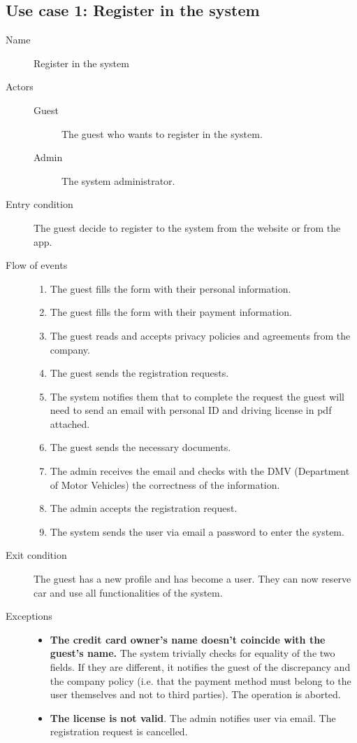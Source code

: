	\subsection{Use case 1: Register in the system}
		\begin{description}
			\item[Name] Register in the system
			\item[Actors] \hfill
				\begin{description}
					\item[Guest] The guest who wants to register in the system.
					\item[Admin] The system administrator.
				\end{description}
			\item[Entry condition] The guest decide to register to the system from the website or from the app.
			\item[Flow of events] \hfill
				\begin{enumerate}
					\item The guest fills the form with their personal information.
					\item The guest fills the form with their payment information. 
					\item The guest reads and accepts privacy policies and agreements from the company.
					\item The guest sends the registration requests.
					\item The system notifies them that to complete the request the guest will need to send an email with personal ID and driving license in pdf attached.
					\item The guest sends the necessary documents.
					\item The admin receives the email and checks with the DMV (Department of Motor Vehicles) the correctness of the information.
					\item The admin accepts the registration request.
					\item The system sends the user via email a password to enter the system.
				\end{enumerate}
			\item[Exit condition] The guest has a new profile and has become a user. They can now reserve car and use all functionalities of the system.
			\item[Exceptions] \hfill
				\begin{itemize}
					\item \textbf{The credit card owner's name doesn't coincide with the guest's name.} The system trivially checks for equality of the two fields. If they are different, it notifies the guest of the discrepancy and the company policy (i.e. that the payment method must belong to the user themselves and not to third parties). The operation is aborted.
					\item \textbf{The license is not valid}. The admin notifies user via email. The registration request is cancelled.
				\end{itemize}
		\end{description}			
	
